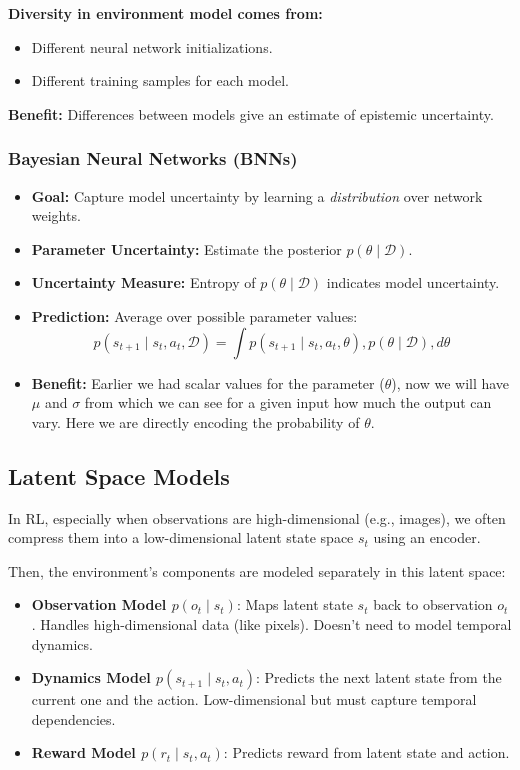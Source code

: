 \documentclass[12pt]{article}
\begin{document}
\textbf{Diversity in environment model comes from:}
\begin{itemize}
    \item Different neural network initializations.
    \item Different training samples for each model.
\end{itemize}

\textbf{Benefit:} Differences between models give an estimate of epistemic uncertainty.

\subsubsection{Bayesian Neural Networks (BNNs)}
\begin{itemize}
\item \textbf{Goal:} Capture model uncertainty by learning a \textit{distribution} over network weights.
\item \textbf{Parameter Uncertainty:} Estimate the posterior $p(\theta \mid \mathcal{D})$.
\item \textbf{Uncertainty Measure:} Entropy of $p(\theta \mid \mathcal{D})$ indicates model uncertainty.
\item \textbf{Prediction:} Average over possible parameter values:
\begin{equation*}
p(s_{t+1} \mid s_t, a_t, \mathcal{D}) = \int p(s_{t+1} \mid s_t, a_t, \theta) , p(\theta \mid \mathcal{D}) , d\theta
\end{equation*}
\item \textbf{Benefit:} Earlier we had scalar values for the parameter ($\theta$), now we will have $\mu$ and $\sigma$ from which we can see for a given input how much the output can vary. Here we are directly encoding the probability of $\theta$.
\end{itemize}

\subsection{Latent Space Models}
In RL, especially when observations are high-dimensional (e.g., images), we often compress them into a low-dimensional latent state space $s_t$ using an encoder.

Then, the environment’s components are modeled separately in this latent space:
\begin{itemize}
    \item \textbf{Observation Model $p(o_t \mid s_t)$}: Maps latent state $s_t$ back to observation $o_t$. Handles high-dimensional data (like pixels). Doesn’t need to model temporal dynamics.
    \item \textbf{Dynamics Model $p(s_{t+1} \mid s_t, a_t)$}: Predicts the next latent state from the current one and the action. Low-dimensional but must capture temporal dependencies.
    \item \textbf{Reward Model $p(r_t \mid s_t, a_t)$}: Predicts reward from latent state and action.
\end{itemize}
\end{document}
